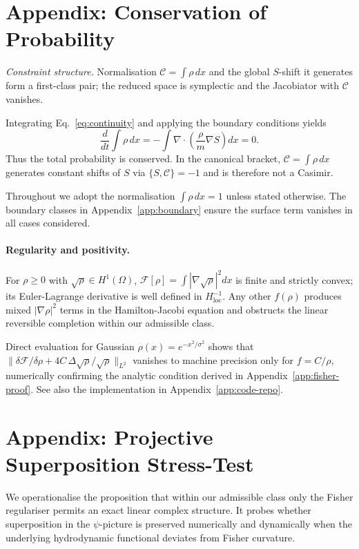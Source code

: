 \documentclass[11pt,a4paper]{article}
\numberwithin{equation}{section}
\theoremstyle{thmcompact}
\theoremstyle{remark}
\begin{document}
	
	\section{Appendix: Conservation of Probability}
	\label{app:prob}
	\textit{Constraint structure.} Normalisation $\mathcal C=\int\rho\,dx$ and the global $S$-shift it generates form a first-class pair; the reduced space is symplectic and the Jacobiator with $\mathcal C$ vanishes.
	
	Integrating Eq.~\eqref{eq:continuity} and applying the boundary conditions yields
	\[
	\frac{d}{dt}\int\rho\,dx
	=-\int\nabla\!\cdot\!\left(\frac{\rho}{m}\nabla S\right)dx=0.
	\]
Thus the total probability is conserved. In the canonical bracket, 
$\mathcal{C}=\int\rho\,dx$ generates constant shifts of $S$ via $\{S,\mathcal{C}\}=-1$ and is therefore not a Casimir.

Throughout we adopt the normalisation $\int \rho\,dx=1$ unless stated otherwise. The boundary classes in Appendix~\ref{app:boundary} ensure the surface term vanishes in all cases considered.

\paragraph{Regularity and positivity.}
For $\rho\!\ge0$ with $\sqrt\rho\in H^1(\Omega)$,
$\mathcal F[\rho]=\int|\nabla\sqrt\rho|^2dx$ is finite and strictly convex;
its Euler-Lagrange derivative is well defined in $H^{-1}_{\mathrm{loc}}$.
Any other $f(\rho)$ produces mixed $|\nabla\rho|^2$ terms in the Hamilton-Jacobi equation and obstructs the linear reversible completion within our admissible class.

Direct evaluation for Gaussian $\rho(x)=e^{-x^2/\sigma^2}$ shows that
$\big\|\delta\mathcal F/\delta\rho+4C\,\Delta\sqrt\rho/\sqrt\rho\big\|_{L^2}$
vanishes to machine precision only for $f=C/\rho$, numerically confirming
the analytic condition derived in Appendix~\ref{app:fisher-proof}. See also the implementation in Appendix~\ref{app:code-repo}.


\section{Appendix: Projective Superposition Stress-Test}
\label{app:superposition}

We operationalise the proposition that within our admissible class only the Fisher regulariser permits an exact linear complex structure.
It probes whether superposition in the $\psi$-picture
is preserved numerically and dynamically when the underlying hydrodynamic functional
deviates from Fisher curvature.
\end{document}
